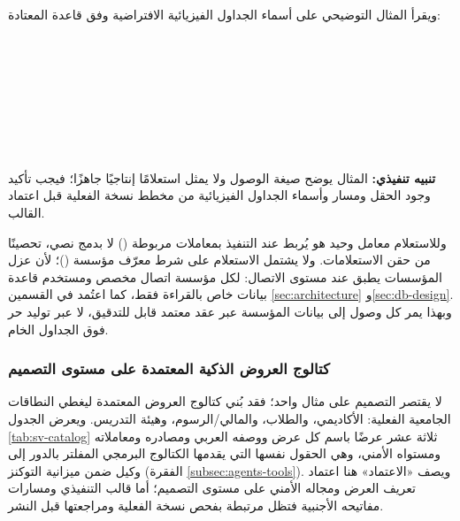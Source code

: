 ويقرأ المثال التوضيحي على أسماء الجداول الفيزيائية الافتراضية وفق قاعدة  المعتادة:

\begin{LTR}
\noindent{}\\
\\
\\
\\
\\
\\
\\
\end{LTR}

\noindent\textbf{تنبيه تنفيذي:} المثال يوضح صيغة الوصول ولا يمثل استعلامًا إنتاجيًا جاهزًا؛ فيجب تأكيد وجود الحقل  ومسار  وأسماء الجداول الفيزيائية من مخطط نسخة  الفعلية قبل اعتماد القالب.

وللاستعلام معامل وحيد هو  يُربط عند التنفيذ بمعاملات مربوطة () لا بدمج نصي، تحصينًا من حقن الاستعلامات. ولا يشتمل الاستعلام على شرط معرّف مؤسسة ()؛ لأن عزل المؤسسات يطبق عند مستوى الاتصال: لكل مؤسسة اتصال مخصص ومستخدم قاعدة بيانات خاص بالقراءة فقط، كما اعتُمد في القسمين \ref{sec:architecture} و\ref{sec:db-design}. وبهذا يمر كل وصول إلى بيانات المؤسسة عبر عقد معتمد قابل للتدقيق، لا عبر توليد حر فوق الجداول الخام.

\subsubsection{كتالوج العروض الذكية المعتمدة على مستوى التصميم}

لا يقتصر التصميم على مثال واحد؛ فقد بُني كتالوج العروض المعتمدة ليغطي النطاقات الجامعية الفعلية: الأكاديمي، والطلاب، والمالي/الرسوم، وهيئة التدريس. ويعرض الجدول \ref{tab:sv-catalog} ثلاثة عشر عرضًا باسم كل عرض ووصفه العربي ومصادره ومعاملاته ومستواه الأمني، وهي الحقول نفسها التي يقدمها الكتالوج البرمجي المفلتر بالدور إلى وكيل  ضمن ميزانية التوكنز (الفقرة \ref{subsec:agents-tools}). ويصف «الاعتماد» هنا اعتماد تعريف العرض ومجاله الأمني على مستوى التصميم؛ أما قالب  التنفيذي ومسارات مفاتيحه الأجنبية فتظل مرتبطة بفحص نسخة  الفعلية ومراجعتها قبل النشر.

